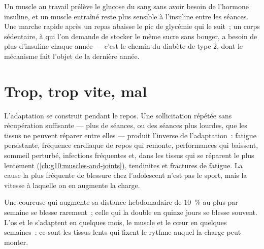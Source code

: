 \begin{example}\label{ex:g10:sport-and-health:sugar}
Un muscle au travail prélève le glucose du sang sans avoir besoin de
l'hormone insuline, et un muscle entraîné reste plus sensible à
l'insuline entre les séances. Une marche rapide après un repas abaisse
le pic de glycémie qui le suit~; un corps sédentaire, à qui l'on
demande de stocker le même sucre sans bouger, a besoin de plus
d'insuline chaque année --- c'est le chemin du diabète de type 2, dont
le mécanisme fait l'objet de la dernière année.
\end{example}

\section{Trop, trop vite, mal}

\begin{proposition}\label{prop:g10:sport-and-health:overtraining}
L'adaptation se construit pendant le repos. Une sollicitation répétée
sans récupération suffisante --- plus de séances, ou des séances plus
lourdes, que les tissus ne peuvent réparer entre elles --- produit
l'inverse de l'adaptation~: fatigue persistante, fréquence cardiaque de
repos qui remonte, performances qui baissent, sommeil perturbé,
infections fréquentes et, dans les tissus qui se réparent le plus
lentement (\cref{ch:g10:muscles-and-joints}), tendinites et fractures
de fatigue. La cause la plus fréquente de blessure chez l'adolescent
n'est pas le sport, mais la vitesse à laquelle on en augmente la
charge.
\end{proposition}
\admitted

\begin{example}\label{ex:g10:sport-and-health:tenpercent}
Une coureuse qui augmente sa distance hebdomadaire de 10~\% au plus par
semaine se blesse rarement~; celle qui la double en quinze jours se
blesse souvent. L'os et le  s'adaptent en quelques mois, le
muscle et le cœur en quelques semaines~: ce sont les tissus lents qui
fixent le rythme auquel la charge peut monter.
\end{example}

